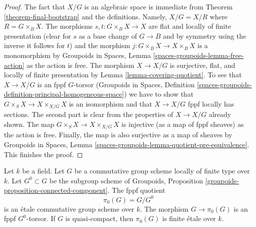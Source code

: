\begin{proof}
The fact that $X/G$ is an algebraic space is immediate from
Theorem \ref{theorem-final-bootstrap}
and the definitions. Namely, $X/G = X/R$ where $R = G \times_B X$.
The morphisms $s, t : G \times_B X \to X$ are flat and locally of
finite presentation (clear for $s$ as a base change of $G \to B$ and
by symmetry using the inverse it follows for $t$) and the morphism
$j : G \times_B X \to X \times_B X$ is a monomorphism by
Groupoids in Spaces, Lemma \ref{spaces-groupoids-lemma-free-action}
as the action is free. The morphism $X \to X/G$ is surjective, flat, and
locally of finite presentation by Lemma \ref{lemma-covering-quotient}.
To see that $X \to X/G$ is an fppf $G$-torsor
(Groupoids in Spaces, Definition
\ref{spaces-groupoids-definition-principal-homogeneous-space})
we have to show that $G \times_S X \to X \times_{X/G} X$
is an isomorphism and that $X \to X/G$ fppf locally has sections.
The second part is clear from the properties of $X \to X/G$ already shown.
The map $G \times_S X \to X \times_{X/G} X$ is injective (as a map of
fppf sheaves) as the action is free. Finally, the map is also surjective
as a map of sheaves by Groupoids in Spaces, Lemma
\ref{spaces-groupoids-lemma-quotient-pre-equivalence}.
This finishes the proof.
\end{proof}

\begin{lemma}
\label{lemma-component-group-scheme-over-field}
Let $k$ be a field. Let $G$ be a commutative group scheme locally of
finite type over $k$. Let $G^0 \subset G$ be the subgroup scheme of
Groupoids, Proposition
\ref{groupoids-proposition-connected-component}. The fppf quotient
$$
\pi_0(G) = G/G^0
$$
is an \'etale commutative group scheme over $k$. The morphism
$G \to \pi_0(G)$ is an fppf $G^0$-torsor. If $G$ is quasi-compact, then
$\pi_0(G)$ is finite \'etale over $k$.
\end{lemma}

